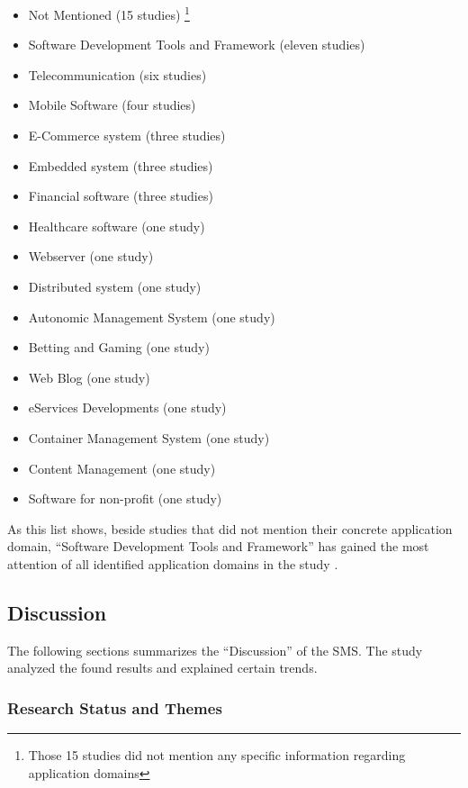 \begin{itemize}
    \item Not Mentioned (15 studies) \footnote{Those 15 studies
              did not mention any specific information regarding application
              domains}
    \item Software Development Tools and Framework (eleven studies)
    \item Telecommunication (six studies)
    \item Mobile Software (four studies)
    \item E-Commerce system (three studies)
    \item Embedded system (three studies)
    \item Financial software (three studies)
    \item Healthcare software (one study)
    \item Webserver (one study)
    \item Distributed system (one study)
    \item Autonomic Management System (one study)
    \item Betting and Gaming (one study)
    \item Web Blog (one study)
    \item eServices Developments (one study)
    \item Container Management System (one study)
    \item Content Management (one study)
    \item Software for non-profit (one study)
\end{itemize}

As this list shows, beside studies that did not mention their concrete
application domain, ``Software Development Tools and Framework''
has gained the most attention of all identified application domains
in the study \cite{waseem:SMSMSADevOps}.

\subsection{Discussion}

The following sections summarizes the ``Discussion'' of the SMS. The study
analyzed the found results and explained certain trends.

\subsubsection{Research Status and Themes}

